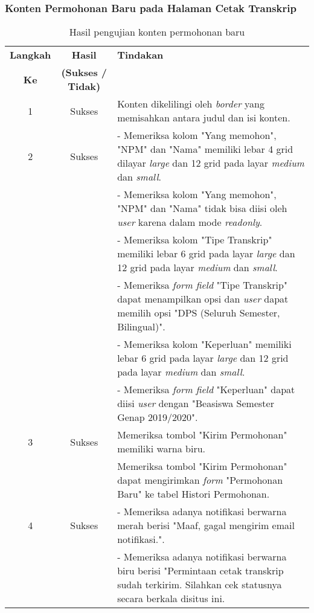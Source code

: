 \subsubsection{Konten Permohonan Baru pada Halaman Cetak Transkrip}
\begin{table}[H]
	\centering 
	\caption{Hasil pengujian konten permohonan baru}
	\label{hasil:PermohonanBaru}
	\begin{tabular}{|c| c| p{}|}
		\toprule
		\textbf{Langkah} & \textbf{Hasil} & \textbf{Tindakan}\\
		\textbf{Ke} & \textbf{(Sukses / Tidak)} &\\
		\midrule
		1&Sukses&Konten dikelilingi oleh \textit{border} yang memisahkan antara judul dan isi konten.\\
		\hline
		2&Sukses& - Memeriksa kolom "Yang memohon", "NPM" dan "Nama" memiliki lebar 4 grid dilayar \textit{large} dan 12 grid pada layar \textit{medium} dan \textit{small}.\\
		&& - Memeriksa kolom "Yang memohon", "NPM" dan "Nama" tidak bisa diisi oleh \textit{user} karena dalam mode \textit{readonly}.\\
		&& - Memeriksa kolom "Tipe Transkrip" memiliki lebar 6 grid pada layar \textit{large} dan 12 grid pada layar \textit{medium} dan \textit{small}.\\
		&& - Memeriksa \textit{form field} "Tipe Transkrip" dapat menampilkan opsi dan \textit{user} dapat memilih opsi "DPS (Seluruh Semester, Bilingual)".\\
		&& - Memeriksa kolom "Keperluan" memiliki lebar 6 grid pada layar \textit{large} dan 12 grid pada layar \textit{medium} dan \textit{small}.\\
		&& - Memeriksa \textit{form field} "Keperluan" dapat diisi \textit{user} dengan "Beasiswa Semester Genap 2019/2020".\\
		\hline
		3&Sukses&Memeriksa tombol "Kirim Permohonan" memiliki warna biru.\\
		&&Memeriksa tombol "Kirim Permohonan" dapat mengirimkan \textit{form} "Permohonan Baru" ke tabel Histori Permohonan.\\
		\hline
		4&Sukses& - Memeriksa adanya notifikasi berwarna merah berisi "Maaf, gagal mengirim email notifikasi.".\\
		&& - Memeriksa adanya notifikasi berwarna biru  berisi "Permintaan cetak transkrip sudah terkirim. Silahkan cek statusnya secara berkala disitus ini.\\		
		\bottomrule		
	\end{tabular} 
\end{table}


